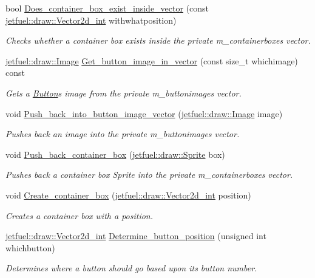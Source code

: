 \begin{DoxyCompactItemize}
bool \hyperlink{classjetfuel_1_1gui_1_1Menu_a311940611ef799e82a1d412618c6206a}{Does\+\_\+container\+\_\+box\+\_\+exist\+\_\+inside\+\_\+vector} (const \hyperlink{classjetfuel_1_1draw_1_1Vector2d}{jetfuel\+::draw\+::\+Vector2d\+\_\+int} withwhatposition)
\begin{DoxyCompactList}\small\item\em Checks whether a container box exists inside the private m\+\_\+containerboxes vector. \end{DoxyCompactList}\item 
\hyperlink{classjetfuel_1_1draw_1_1Image}{jetfuel\+::draw\+::\+Image} \hyperlink{classjetfuel_1_1gui_1_1Menu_a0e59c1130398764ba7880ae38ba755e3}{Get\+\_\+button\+\_\+image\+\_\+in\+\_\+vector} (const size\+\_\+t whichimage) const
\begin{DoxyCompactList}\small\item\em Gets a \hyperlink{classjetfuel_1_1gui_1_1Button}{Button}\textquotesingle{}s image from the private m\+\_\+buttonimages vector. \end{DoxyCompactList}\item 
void \hyperlink{classjetfuel_1_1gui_1_1Menu_a265f704501aa00be0bc2059729896d55}{Push\+\_\+back\+\_\+into\+\_\+button\+\_\+image\+\_\+vector} (\hyperlink{classjetfuel_1_1draw_1_1Image}{jetfuel\+::draw\+::\+Image} image)
\begin{DoxyCompactList}\small\item\em Pushes back an image into the private m\+\_\+buttonimages vector. \end{DoxyCompactList}\item 
void \hyperlink{classjetfuel_1_1gui_1_1Menu_aa685f56941a8d70eafe30fb325abf38d}{Push\+\_\+back\+\_\+container\+\_\+box} (\hyperlink{classjetfuel_1_1draw_1_1Sprite}{jetfuel\+::draw\+::\+Sprite} box)
\begin{DoxyCompactList}\small\item\em Pushes back a container box Sprite into the private m\+\_\+containerboxes vector. \end{DoxyCompactList}\item 
void \hyperlink{classjetfuel_1_1gui_1_1Menu_a1efd742a6622d24a3ed6ae6a05fcba63}{Create\+\_\+container\+\_\+box} (\hyperlink{classjetfuel_1_1draw_1_1Vector2d}{jetfuel\+::draw\+::\+Vector2d\+\_\+int} position)
\begin{DoxyCompactList}\small\item\em Creates a container box with a position. \end{DoxyCompactList}\item 
\hyperlink{classjetfuel_1_1draw_1_1Vector2d}{jetfuel\+::draw\+::\+Vector2d\+\_\+int} \hyperlink{classjetfuel_1_1gui_1_1Menu_a9432e513bdc7deefab9da0f596144dc5}{Determine\+\_\+button\+\_\+position} (unsigned int whichbutton)
\begin{DoxyCompactList}\small\item\em Determines where a button should go based upon it\textquotesingle{}s button number. \end{DoxyCompactList}\end{DoxyCompactItemize}


